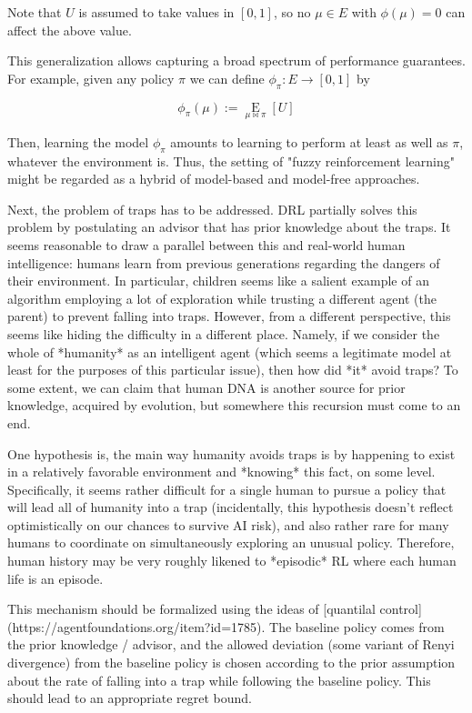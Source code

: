 \documentclass[a4paper]{article}
\newcommand{\AB}[1]{\left[#1\right]}
\newcommand{\Ea}[2]{\underset{#1}{\operatorname{E}}\AB{#2}}
\begin{document}
Note that $U$ is assumed to take values in $[0,1]$, so no $\mu \in E$ with $\phi(\mu) = 0$ can affect the above value.

This generalization allows capturing a broad spectrum of performance guarantees. For example, given any policy $\pi$ we can define $\phi_\pi: E \rightarrow [0,1]$ by

$$\phi_\pi(\mu):=\Ea{\mu\bowtie\pi}{U}$$

Then, learning the model $\phi_\pi$ amounts to learning to perform at least as well as $\pi$, whatever the environment is. Thus, the setting of "fuzzy reinforcement learning" might be regarded as a hybrid of model-based and model-free approaches.

Next, the problem of traps has to be addressed. DRL partially solves this problem by postulating an advisor that has prior knowledge about the traps. It seems reasonable to draw a parallel between this and real-world human intelligence: humans learn from previous generations regarding the dangers of their environment. In particular, children seems like a salient example of an algorithm employing a lot of exploration while trusting a different agent (the parent) to prevent falling into traps. However, from a different perspective, this seems like hiding the difficulty in a different place. Namely, if we consider the whole of *humanity* as an intelligent agent (which seems a legitimate model at least for the purposes of this particular issue), then how did *it* avoid traps? To some extent, we can claim that human DNA is another source for prior knowledge, acquired by evolution, but somewhere this recursion must come to an end.

One hypothesis is, the main way humanity avoids traps is by happening to exist in a relatively favorable environment and *knowing* this fact, on some level. Specifically, it seems rather difficult for a single human to pursue a policy that will lead all of humanity into a trap (incidentally, this hypothesis doesn't reflect optimistically on our chances to survive AI risk), and also rather rare for many humans to coordinate on simultaneously exploring an unusual policy. Therefore, human history may be very roughly likened to *episodic* RL where each human life is an episode.

This mechanism should be formalized using the ideas of [quantilal control](https://agentfoundations.org/item?id=1785). The baseline policy comes from the prior knowledge / advisor, and the allowed deviation (some variant of Renyi divergence) from the baseline policy is chosen according to the prior assumption about the rate of falling into a trap while following the baseline policy. This should lead to an appropriate regret bound.
\end{document}
